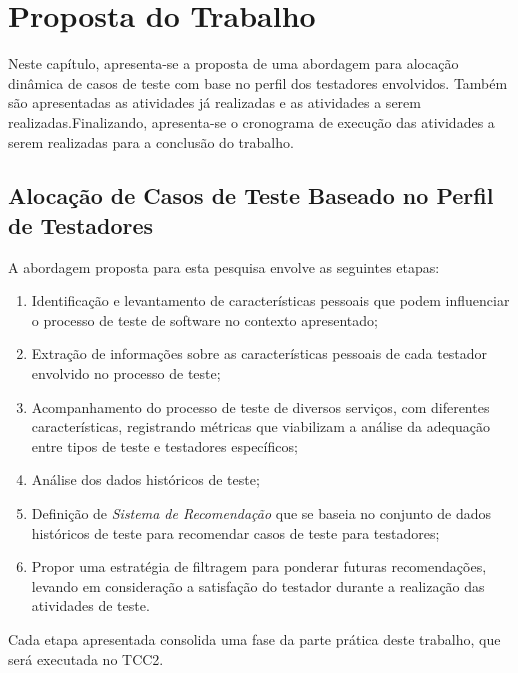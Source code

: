 \chapter{Proposta do Trabalho}
\label{ch:proposta}

Neste capítulo, apresenta-se a proposta de uma abordagem para alocação dinâmica de casos de teste com base no perfil dos testadores envolvidos. Também são apresentadas as atividades já realizadas e as atividades a serem realizadas.Finalizando, apresenta-se o cronograma de execução das atividades a serem realizadas para a conclusão do trabalho. 

\section{Alocação de Casos de Teste Baseado no Perfil de Testadores}

A abordagem proposta para esta pesquisa envolve as seguintes etapas:

\begin{enumerate}
    \item Identificação e levantamento de características pessoais que podem influenciar o processo de teste de software no contexto apresentado; 
    
    \item Extração de informações sobre as características pessoais de cada testador envolvido no processo de teste;
    
    \item Acompanhamento do processo de teste de diversos serviços, com diferentes características, registrando métricas que viabilizam a análise da adequação entre tipos de teste e testadores específicos;
    
    \item Análise dos dados históricos de teste;
    
    \item Definição de \textit{Sistema de Recomendação} que se baseia no conjunto de dados históricos de teste para recomendar casos de teste para testadores;
    
    \item Propor uma estratégia de filtragem para ponderar futuras recomendações, levando em consideração a satisfação do testador durante a realização das atividades de teste.
\end{enumerate}

Cada etapa apresentada consolida uma fase da parte prática deste trabalho, que será executada no TCC2. 

